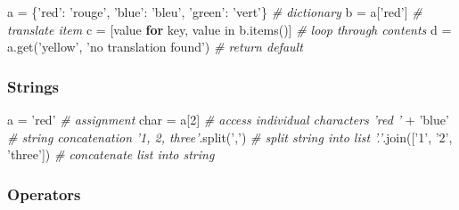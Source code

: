 \documentclass[10pt,a4paperpaper,twocolumn]{article}
\newenvironment{Shaded}{}{}
\newcommand{\DecValTok}[1]{\textcolor[rgb]{0.25,0.63,0.44}{{#1}}}
\newcommand{\StringTok}[1]{\textcolor[rgb]{0.25,0.44,0.63}{{#1}}}
\newcommand{\CommentTok}[1]{\textcolor[rgb]{0.38,0.63,0.69}{\textit{{#1}}}}
\newcommand{\ControlFlowTok}[1]{\textcolor[rgb]{0.00,0.44,0.13}{\textbf{{#1}}}}
\newcommand{\OperatorTok}[1]{\textcolor[rgb]{0.40,0.40,0.40}{{#1}}}
\newcommand{\NormalTok}[1]{{#1}}
\begin{document}
\begin{Shaded}
\begin{Highlighting}[]
\NormalTok{a }\OperatorTok{=} \NormalTok{\{}\StringTok{'red'}\NormalTok{: }\StringTok{'rouge'}\NormalTok{, }\StringTok{'blue'}\NormalTok{: }\StringTok{'bleu'}\NormalTok{, }\StringTok{'green'}\NormalTok{: }\StringTok{'vert'}\NormalTok{\}  }\CommentTok{# dictionary}
\NormalTok{b }\OperatorTok{=} \NormalTok{a[}\StringTok{'red'}\NormalTok{]                                           }\CommentTok{# translate item}
\NormalTok{c }\OperatorTok{=} \NormalTok{[value }\ControlFlowTok{for} \NormalTok{key, value }\OperatorTok{in} \NormalTok{b.items()]                }\CommentTok{# loop through contents}
\NormalTok{d }\OperatorTok{=} \NormalTok{a.get(}\StringTok{'yellow'}\NormalTok{, }\StringTok{'no translation found'}\NormalTok{)            }\CommentTok{# return default}
\end{Highlighting}
\end{Shaded}

\hypertarget{strings}{\subsubsection{Strings}\label{strings}}

\begin{Shaded}
\begin{Highlighting}[]
\NormalTok{a }\OperatorTok{=} \StringTok{'red'}                      \CommentTok{# assignment}
\NormalTok{char }\OperatorTok{=} \NormalTok{a[}\DecValTok{2}\NormalTok{]                    }\CommentTok{# access individual characters}
\CommentTok{'red '} \OperatorTok{+} \StringTok{'blue'}                \CommentTok{# string concatenation}
\CommentTok{'1, 2, three'}\NormalTok{.split(}\StringTok{','}\NormalTok{)       }\CommentTok{# split string into list}
\CommentTok{'.'}\NormalTok{.join([}\StringTok{'1'}\NormalTok{, }\StringTok{'2'}\NormalTok{, }\StringTok{'three'}\NormalTok{])  }\CommentTok{# concatenate list into string}
\end{Highlighting}
\end{Shaded}

\hypertarget{operators}{\subsubsection{Operators}\label{operators}}
\end{document}

